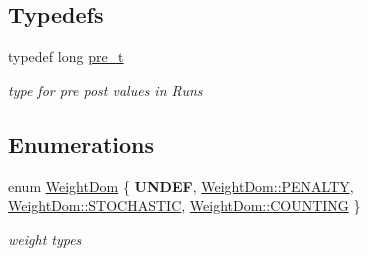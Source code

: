 \subsection*{Typedefs}
\begin{DoxyCompactItemize}
\item 
\mbox{\label{group__general_ga092fe8b972dfa977c2a0886720a7731e}} 
typedef long \mbox{\hyperlink{group__general_ga092fe8b972dfa977c2a0886720a7731e}{pre\+\_\+t}}
\begin{DoxyCompactList}\small\item\em type for pre post values in Runs \end{DoxyCompactList}\end{DoxyCompactItemize}
\subsection*{Enumerations}
\begin{DoxyCompactItemize}
\item 
enum \mbox{\hyperlink{group__general_gae07bdce6f4896785ead3b815ca6ab560}{Weight\+Dom}} \{ {\bfseries U\+N\+D\+EF}, 
\mbox{\hyperlink{group__general_ggae07bdce6f4896785ead3b815ca6ab560a0e9bc37ec6da933200c9464b9585415e}{Weight\+Dom\+::\+P\+E\+N\+A\+L\+TY}}, 
\mbox{\hyperlink{group__general_ggae07bdce6f4896785ead3b815ca6ab560aefc3ccac9f36534e7235c64ca7e56a1e}{Weight\+Dom\+::\+S\+T\+O\+C\+H\+A\+S\+T\+IC}}, 
\mbox{\hyperlink{group__general_ggae07bdce6f4896785ead3b815ca6ab560aa5fa48e29b30e37389febd475c4c866a}{Weight\+Dom\+::\+C\+O\+U\+N\+T\+I\+NG}}
 \}
\begin{DoxyCompactList}\small\item\em weight types \end{DoxyCompactList}\end{DoxyCompactItemize}
